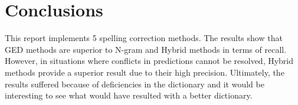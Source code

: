 \documentclass[11pt]{article}
\begin{document}
\section{Conclusions}
This report implements 5 spelling correction methods. The results show that GED methods are superior to N-gram and Hybrid methods in terms of recall. However, in situations where conflicts in predictions cannot be resolved, Hybrid methods provide a superior result due to their high precision. Ultimately, the results suffered because of deficiencies in the dictionary and it would be interesting to see what would have resulted with a better dictionary.

\newpage

\nocite{*}

\end{document}
